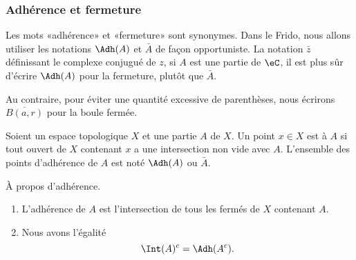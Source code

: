 \subsubsection{Adhérence et fermeture}

\begin{normaltext}
	Les mots «adhérence» et «fermeture» sont synonymes. Dans le Frido, nous allons utiliser les notations \( \Adh(A)\) et \( \bar A\) de façon opportuniste. La notation \( \bar z\) définissant le complexe conjugué de \( z\), si \( A\) est une partie de \( \eC\), il est plus sûr d'écrire \( \Adh(A)\) pour la fermeture, plutôt que \( \bar A\).

	Au contraire, pour éviter une quantité excessive de parenthèses, nous écrirons \( \overline{ B(a,r) }\) pour la boule fermée.
\end{normaltext}

\begin{definition}      \label{DEFooSVWMooLpAVZR}
	Soient un espace topologique \( X\) et une partie \( A\) de \( X\). Un point \( x\in X\) est  à \( A\) si tout ouvert de \( X\) contenant \( x\) a une intersection non vide avec \( A\). L'ensemble des points d'adhérence de \( A\) est noté \( \Adh(A)\) ou \( \bar A\).
\end{definition}

\begin{lemma}       \label{LEMooILNCooOFZaTe}
	À propos d'adhérence.
	\begin{enumerate}
		\item
		      L'adhérence de \( A\) est l'intersection de tous les fermés de \( X\) contenant \( A\).
		\item
		      Nous avons l'égalité
		      \begin{equation}
			      \Int(A)^c = \Adh(A^c).
		      \end{equation}
	\end{enumerate}
\end{lemma}

